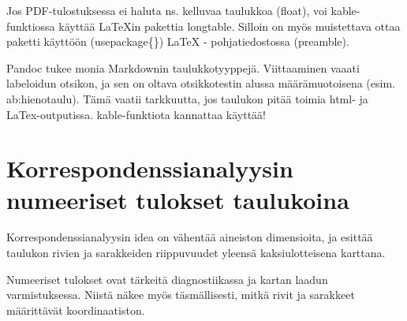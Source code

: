 \documentclass[
  finnish,
]{book}
\newenvironment{Shaded}{\begin{snugshade}}{\end{snugshade}}
\newcommand{\CommentTok}[1]{\textcolor[rgb]{0.56,0.35,0.01}{\textit{#1}}}
\newcommand{\KeywordTok}[1]{\textcolor[rgb]{0.13,0.29,0.53}{\textbf{#1}}}
\newcommand{\NormalTok}[1]{#1}
\newcommand{\StringTok}[1]{\textcolor[rgb]{0.31,0.60,0.02}{#1}}
\begin{document}
Jos PDF-tulostuksessa ei haluta ns. kelluvaa taulukkoa (float), voi kable-funktiossa käyttää LaTeXin pakettia longtable. Silloin on myös muistettava ottaa paketti käyttöön (usepackage\{\}) LaTeX - pohjatiedostossa (preamble).

Pandoc tukee monia Markdownin taulukkotyyppejä. Viittaaminen vaaati labeloidun otsikon, ja sen on oltava otsikkotestin alussa määrämuotoisena (esim. ab:hienotaulu). Tämä vaatii tarkkuutta, jos taulukon pitää toimia html- ja LaTex-outputissa. kable-funktiota kannattaa käyttää!

\hypertarget{korrespondenssianalyysin-numeeriset-tulokset-taulukoina}{%
\section{Korrespondenssianalyysin numeeriset tulokset taulukoina}\label{korrespondenssianalyysin-numeeriset-tulokset-taulukoina}}

Korrespondenssianalyysin idea on vähentää aineiston dimensioita, ja esittää taulukon rivien ja sarakkeiden riippuvuudet yleensä kaksiulotteisena karttana.

Numeeriset tulokset ovat tärkeitä diagnostiikassa ja kartan laadun varmistuksessa. Niistä näkee myös täsmällisesti, mitkä rivit ja sarakkeet määrittävät koordinaatiston.

\begin{Shaded}
\end{Shaded}
\end{document}
